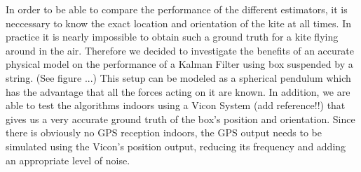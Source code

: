 In order to be able to compare the performance of the different estimators, it is neccessary to know the exact location and orientation of the kite at all times. In practice it is nearly impossible to obtain such a ground truth for a kite flying around in the air. Therefore we decided to investigate the benefits of an accurate physical model on the performance of a Kalman Filter using box suspended by a string. (See figure ...) This setup can be modeled as a spherical pendulum which has the advantage that all the forces acting on it are known.  In addition, we are able to test the algorithms indoors using a Vicon System (add reference!!) that gives us a very accurate ground truth of the box's position and orientation. Since there is obviously no GPS reception indoors, the GPS output needs to be simulated using the Vicon's position output, reducing its frequency and adding an appropriate level of noise.



